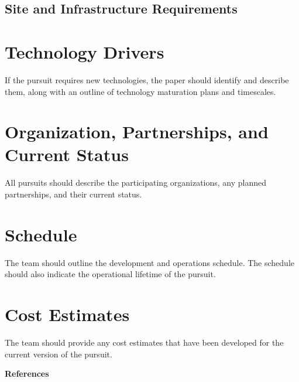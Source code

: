 \documentclass[12pt]{article}
\begin{document}
\subsection{Site and Infrastructure Requirements}


\section{Technology Drivers}
\color{blue}
If the pursuit requires new technologies, the paper should identify and describe them, along with an outline of technology maturation plans and timescales.
\color{black}

\section{Organization, Partnerships, and
Current Status} 
\color{blue}
All pursuits should describe the participating organizations, any planned partnerships, and their current status.
\color{black}

\section{Schedule} 
\color{blue}
The team should outline the development and operations schedule. The schedule should also indicate the operational lifetime of the pursuit.
\color{black}

\section{Cost Estimates}
\color{blue}
 The team should provide any cost estimates that have been developed for the current version of the pursuit. 
 \color{black}

\pagebreak
\textbf{References}
\end{document}
